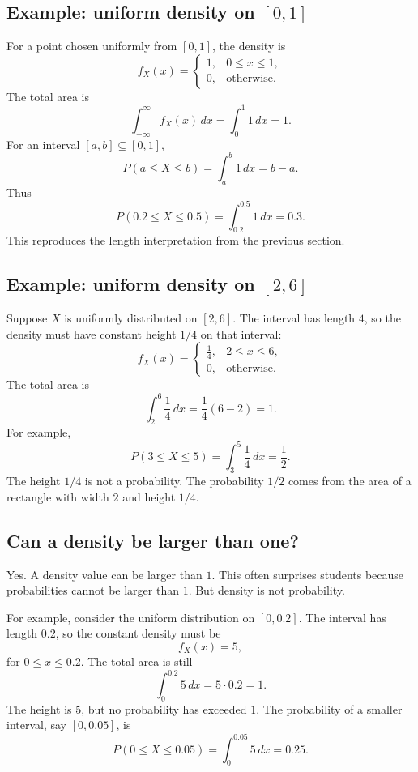 \subsection*{Example: uniform density on \([0,1]\)}

For a point chosen uniformly from \([0,1]\), the density is
\[
f_X(x)=
\begin{cases}
1, & 0\leq x\leq 1,\\
0, & \text{otherwise}.
\end{cases}
\]
The total area is
\[
\int_{-\infty}^{\infty} f_X(x)\,dx=\int_0^1 1\,dx=1.
\]
For an interval \([a,b]\subseteq[0,1]\),
\[
P(a\leq X\leq b)=\int_a^b 1\,dx=b-a.
\]
Thus
\[
P(0.2\leq X\leq 0.5)=\int_{0.2}^{0.5}1\,dx=0.3.
\]
This reproduces the length interpretation from the previous section.

\subsection*{Example: uniform density on \([2,6]\)}

Suppose \(X\) is uniformly distributed on \([2,6]\). The interval has length
\(4\), so the density must have constant height \(1/4\) on that interval:
\[
f_X(x)=
\begin{cases}
\frac14, & 2\leq x\leq 6,\\
0, & \text{otherwise}.
\end{cases}
\]
The total area is
\[
\int_2^6 \frac14\,dx=\frac14(6-2)=1.
\]
For example,
\[
P(3\leq X\leq 5)=\int_3^5 \frac14\,dx=\frac12.
\]
The height \(1/4\) is not a probability. The probability \(1/2\) comes from the
area of a rectangle with width \(2\) and height \(1/4\).

\subsection*{Can a density be larger than one?}

Yes. A density value can be larger than \(1\). This often surprises students
because probabilities cannot be larger than \(1\). But density is not
probability.

For example, consider the uniform distribution on \([0,0.2]\). The interval has
length \(0.2\), so the constant density must be
\[
f_X(x)=5,
\]
for \(0\leq x\leq 0.2\). The total area is still
\[
\int_0^{0.2}5\,dx=5\cdot 0.2=1.
\]
The height is \(5\), but no probability has exceeded \(1\). The probability of a
smaller interval, say \([0,0.05]\), is
\[
P(0\leq X\leq 0.05)=\int_0^{0.05}5\,dx=0.25.
\]

